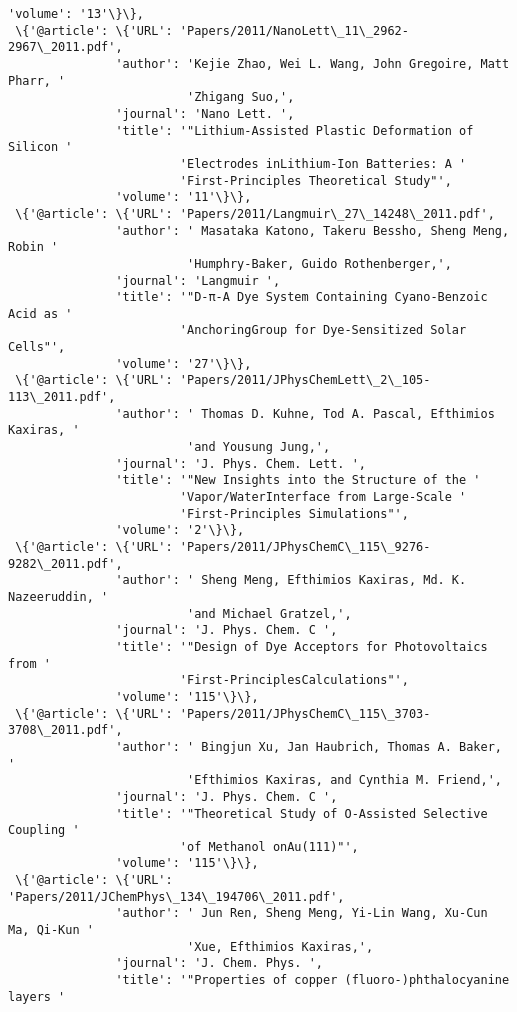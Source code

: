 \documentclass[11pt]{article}
\begin{document}
\begin{Verbatim}[commandchars=\\\{\}]
               'volume': '13'\}\},
 \{'@article': \{'URL': 'Papers/2011/NanoLett\_11\_2962-2967\_2011.pdf',
               'author': 'Kejie Zhao, Wei L. Wang, John Gregoire, Matt Pharr, '
                         'Zhigang Suo,',
               'journal': 'Nano Lett. ',
               'title': '"Lithium-Assisted Plastic Deformation of Silicon '
                        'Electrodes inLithium-Ion Batteries: A '
                        'First-Principles Theoretical Study"',
               'volume': '11'\}\},
 \{'@article': \{'URL': 'Papers/2011/Langmuir\_27\_14248\_2011.pdf',
               'author': ' Masataka Katono, Takeru Bessho, Sheng Meng, Robin '
                         'Humphry-Baker, Guido Rothenberger,',
               'journal': 'Langmuir ',
               'title': '"D-π-A Dye System Containing Cyano-Benzoic Acid as '
                        'AnchoringGroup for Dye-Sensitized Solar Cells"',
               'volume': '27'\}\},
 \{'@article': \{'URL': 'Papers/2011/JPhysChemLett\_2\_105-113\_2011.pdf',
               'author': ' Thomas D. Kuhne, Tod A. Pascal, Efthimios Kaxiras, '
                         'and Yousung Jung,',
               'journal': 'J. Phys. Chem. Lett. ',
               'title': '"New Insights into the Structure of the '
                        'Vapor/WaterInterface from Large-Scale '
                        'First-Principles Simulations"',
               'volume': '2'\}\},
 \{'@article': \{'URL': 'Papers/2011/JPhysChemC\_115\_9276-9282\_2011.pdf',
               'author': ' Sheng Meng, Efthimios Kaxiras, Md. K. Nazeeruddin, '
                         'and Michael Gratzel,',
               'journal': 'J. Phys. Chem. C ',
               'title': '"Design of Dye Acceptors for Photovoltaics from '
                        'First-PrinciplesCalculations"',
               'volume': '115'\}\},
 \{'@article': \{'URL': 'Papers/2011/JPhysChemC\_115\_3703-3708\_2011.pdf',
               'author': ' Bingjun Xu, Jan Haubrich, Thomas A. Baker, '
                         'Efthimios Kaxiras, and Cynthia M. Friend,',
               'journal': 'J. Phys. Chem. C ',
               'title': '"Theoretical Study of O-Assisted Selective Coupling '
                        'of Methanol onAu(111)"',
               'volume': '115'\}\},
 \{'@article': \{'URL': 'Papers/2011/JChemPhys\_134\_194706\_2011.pdf',
               'author': ' Jun Ren, Sheng Meng, Yi-Lin Wang, Xu-Cun Ma, Qi-Kun '
                         'Xue, Efthimios Kaxiras,',
               'journal': 'J. Chem. Phys. ',
               'title': '"Properties of copper (fluoro-)phthalocyanine layers '

\end{Verbatim}
\end{document}
